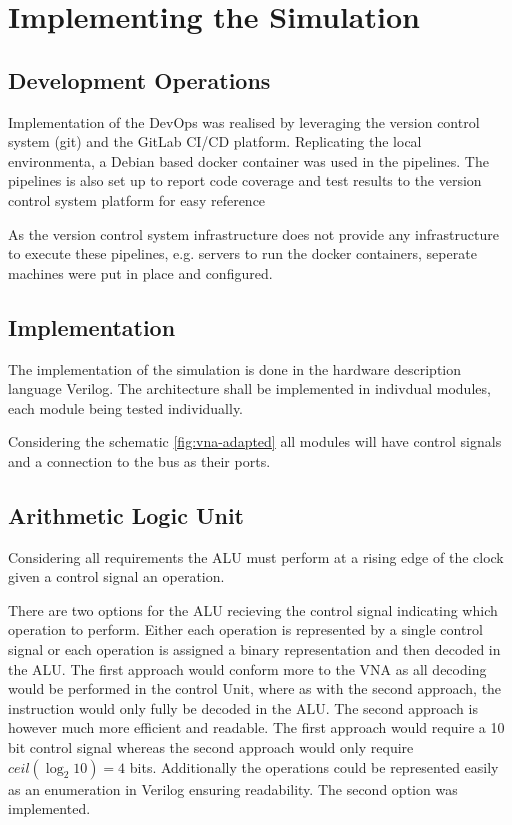\chapter{Implementing the Simulation}

\section{Development Operations }
Implementation of the DevOps was realised by leveraging the version control system (git) and the GitLab CI/CD platform. Replicating the local environmenta, a Debian based docker container \cite{dockerVerilator} was used in the pipelines. The pipelines is also set up to report code coverage and test results to the version control system platform for easy reference

As the version control system infrastructure does not provide any infrastructure to execute these pipelines, e.g. servers to run the docker containers, seperate machines were put in place and configured.


\section{Implementation}



The implementation of the simulation is done in the hardware description language Verilog. The architecture shall be implemented in indivdual modules, each module being tested individually.    

Considering the schematic \ref{fig:vna-adapted} all modules will have control signals and a connection to the bus as their ports.  

\section{Arithmetic Logic Unit}
Considering all requirements the ALU must perform at a rising edge of the clock given a control signal an operation. 


There are two options for the ALU recieving the control signal indicating which operation to perform. Either each operation is represented by a single control signal or each operation is assigned a binary representation and then decoded in the ALU. The first approach would conform more to the VNA as all decoding would be performed in the control Unit, where as with the second approach, the instruction would only fully be decoded in the ALU. The second approach is however much more efficient and readable. The first approach would require a 10 bit control signal whereas the second approach would only require $ceil(\log_2 10) = 4$ bits. Additionally the operations could be represented easily as an enumeration in Verilog ensuring readability. The second option was implemented. 

